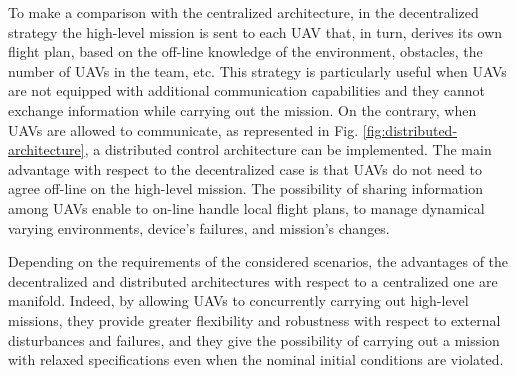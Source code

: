 \documentclass[letterpaper, 10 pt, conference]{ieeeconf}
\begin{document}
%
To make a comparison with the centralized architecture, in the decentralized strategy the high-level mission is sent to each UAV that, in turn, derives its own flight plan, based on the off-line knowledge of the environment, obstacles, the number of UAVs in the team, etc. This strategy is particularly useful when UAVs are not equipped with additional communication capabilities and they cannot exchange information while carrying out the mission. 
%
On the contrary, when UAVs are allowed to communicate, as represented in Fig. \ref{fig:distributed-architecture}, a distributed control architecture can be implemented. The main advantage with respect to the decentralized case is that UAVs do not need to agree off-line on the high-level mission. The possibility of sharing information among UAVs enable to on-line handle local flight plans, to manage dynamical varying environments, device's failures, and mission's changes. 

Depending on the requirements of the considered scenarios, the advantages of the decentralized and distributed architectures with respect to a centralized one are manifold. Indeed, by allowing UAVs to concurrently carrying out high-level missions, they provide greater flexibility and robustness with respect to external disturbances and failures, and they give the possibility of carrying out a mission with relaxed specifications even when the nominal initial conditions are violated.
\end{document}
